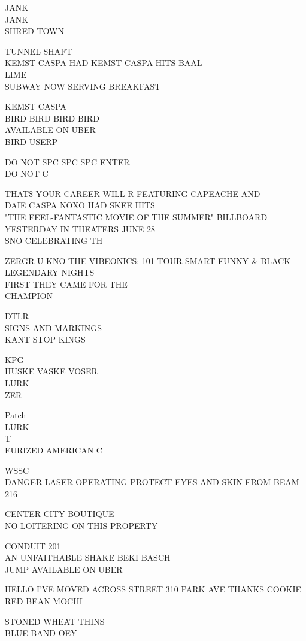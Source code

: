 \documentclass[10pt,letterpaper]{article}
\begin{document}
JANK\\
JANK\\
SHRED TOWN

TUNNEL SHAFT\\
KEMST CASPA HAD KEMST CASPA HITS BAAL\\
LIME\\
SUBWAY NOW SERVING BREAKFAST

KEMST CASPA\\
BIRD BIRD BIRD BIRD\\
AVAILABLE ON UBER\\
BIRD USERP

DO NOT SPC SPC SPC ENTER\\
DO NOT C

THAT\$ YOUR CAREER WILL R FEATURING CAPEACHE AND\\
DAIE CASPA NOXO HAD SKEE HITS\\
"THE FEEL{-}FANTASTIC MOVIE OF THE SUMMER" BILLBOARD YESTERDAY IN THEATERS JUNE 28\\
SNO CELEBRATING TH

ZERGR U KNO THE VIBEONICS: 101 TOUR SMART FUNNY \& BLACK\\
LEGENDARY NIGHTS\\
FIRST THEY CAME FOR THE\\
CHAMPION

DTLR\\
SIGNS AND MARKINGS\\
KANT STOP KINGS

KPG\\
HUSKE VASKE VOSER\\
LURK\\
ZER

Patch\\
LURK\\
T\\
EURIZED AMERICAN C

WSSC\\
DANGER LASER OPERATING PROTECT EYES AND SKIN FROM BEAM\\
216

CENTER CITY BOUTIQUE\\
NO LOITERING ON THIS PROPERTY

CONDUIT 201\\
AN UNFAITHABLE SHAKE BEKI BASCH\\
JUMP AVAILABLE ON UBER

HELLO I'VE MOVED ACROSS STREET 310 PARK AVE THANKS COOKIE\\
RED BEAN MOCHI

STONED WHEAT THINS\\
BLUE BAND OEY
\end{document}
